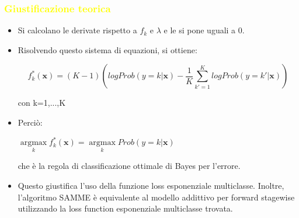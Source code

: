 \documentclass[handout
]{beamer}
\def\yellow#1{{\textcolor{yellow}{#1}}}
\begin{document}
\begin{frame}
\frametitle{\yellow{Giustificazione teorica}}
\begin{itemize}
\item Si calcolano le derivate rispetto a 
\begin{math}
 f_k
\end{math} e \begin{math}
              \lambda
             \end{math} e le si pone uguali a 0.
\item Risolvendo questo sistema di equazioni, si ottiene:
\begin{center}
 \begin{equation}\label{eq:lagrange}
 f_k^*(\textbf{x}) = (K-1) (log Prob(y=k|\textbf{x}) - \frac{1}{K}\sum_{k'=1}^K log Prob(y=k'|\textbf{x}))
\end{equation}
\end{center}
con k=1,...,K
\item Perci\`o:
\begin{center}
 \begin{math} \underset{k}{\operatorname{argmax}} f_k^*(\textbf{x}) = 
\underset{k}{\operatorname{argmax}}Prob(y=k|\textbf{x})
\end{math}
\end{center}
che \`e la regola di classificazione ottimale di Bayes per l'errore.
\item Questo giustifica l'uso della 
funzione loss esponenziale multiclasse. Inoltre, l'algoritmo SAMME \`e equivalente 
al modello addittivo per forward stagewise utilizzando 
la loss function esponenziale multiclasse trovata.

\end{itemize}
\end{frame}
\end{document}
